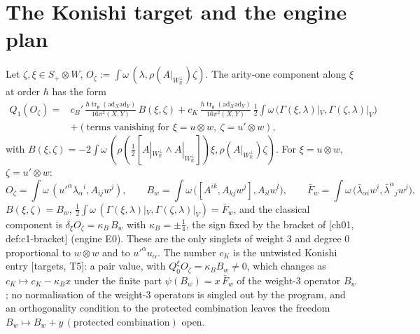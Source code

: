 \section{The Konishi target and the engine plan}

\begin{proposition}
\label{prop:o-konishi}
Let $\zeta,\xi\in S_+\otimes W$, $O_\zeta:=\int\omega\,(\lambda,\rho(A|_{W_{\mathbb R}^\perp})\zeta)$. The arity-one component along $\xi$ at order $\hbar$ has the form
\begin{equation}
\begin{aligned}
Q_1(O_\zeta)={}&c_B'\,\frac{\hbar\operatorname{tr}_{\mathfrak g}(\mathrm{ad}_X\mathrm{ad}_Y)}{16\pi^2(X,Y)}\,B(\xi,\zeta)+c_K\,\frac{\hbar\operatorname{tr}_{\mathfrak g}(\mathrm{ad}_X\mathrm{ad}_Y)}{16\pi^2(X,Y)}\,\tfrac12\int\omega\,\big(\Gamma(\xi,\lambda)|_V,\Gamma(\zeta,\lambda)|_V\big)\\
&+(\text{terms vanishing for }\xi=u\otimes w,\ \zeta=u'\otimes w),
\end{aligned}
\label{eq:o-konishi}
\end{equation}
with $B(\xi,\zeta)=-2\int\omega\,(\rho(\tfrac12[A|_{W_{\mathbb R}^\perp}\wedge A|_{W_{\mathbb R}^\perp}])\xi,\rho(A|_{W_{\mathbb R}^\perp})\zeta)$. For $\xi=u\otimes w$, $\zeta=u'\otimes w$:
\begin{equation}
O_\zeta=\int\omega\,(u'^\alpha\lambda_\alpha{}^i,A_{ij}w^j),\qquad B_w=\int\omega\,\big([A^{ik},A_{kj}w^j],A_{il}w^l\big),\qquad \bar F_w=\int\omega\,\big(\bar\lambda_{\dot\alpha i}w^i,\bar\lambda^{\dot\alpha}{}_jw^j\big),
\label{eq:o-BF}
\end{equation}
$B(\xi,\zeta)=B_w$, $\tfrac12\int\omega\,(\Gamma(\xi,\lambda)|_V,\Gamma(\zeta,\lambda)|_V)=\bar F_w$, and the classical component is $\delta_\xi O_\zeta=\kappa_B\,B_w$ with $\kappa_B=\pm\tfrac14$, the sign fixed by the bracket of [ch01, def:c1-bracket] (engine E0). These are the only singlets of weight $3$ and degree $0$ proportional to $w\otimes w$ and to $u'^\alpha u_\alpha$. The number $c_K$ is the untwisted Konishi entry [targets, T5]: a pair value, with $Q_0^\xi O_\zeta=\kappa_BB_w\neq0$, which changes as $c_K\mapsto c_K-\kappa_Bx$ under the finite part $\psi(B_w)=x\,\bar F_w$ of the weight-$3$ operator $B_w$; no normalisation of the weight-$3$ operators is singled out by the program, and an orthogonality condition to the protected combination leaves the freedom $B_w\mapsto B_w+y\,(\text{protected combination})$ open.
\end{proposition}

